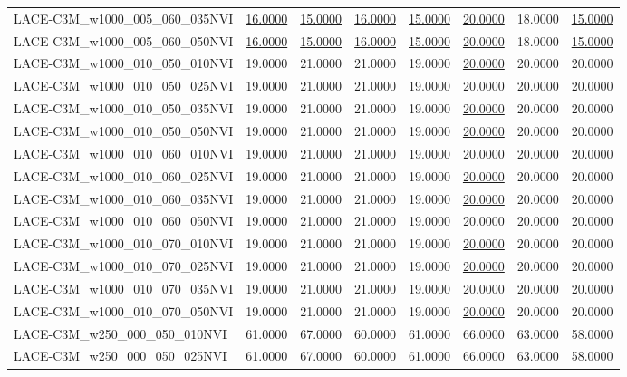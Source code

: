 \begin{table}
\begin{tabular}{lrrrrrrr}
LACE-C3M\_w1000\_005\_060\_035NVI & \underline{16.0000} & \underline{15.0000} & \underline{16.0000} & \underline{15.0000} & \underline{20.0000} & 18.0000 & \underline{15.0000} \\
LACE-C3M\_w1000\_005\_060\_050NVI & \underline{16.0000} & \underline{15.0000} & \underline{16.0000} & \underline{15.0000} & \underline{20.0000} & 18.0000 & \underline{15.0000} \\
LACE-C3M\_w1000\_010\_050\_010NVI & 19.0000 & 21.0000 & 21.0000 & 19.0000 & \underline{20.0000} & 20.0000 & 20.0000 \\
LACE-C3M\_w1000\_010\_050\_025NVI & 19.0000 & 21.0000 & 21.0000 & 19.0000 & \underline{20.0000} & 20.0000 & 20.0000 \\
LACE-C3M\_w1000\_010\_050\_035NVI & 19.0000 & 21.0000 & 21.0000 & 19.0000 & \underline{20.0000} & 20.0000 & 20.0000 \\
LACE-C3M\_w1000\_010\_050\_050NVI & 19.0000 & 21.0000 & 21.0000 & 19.0000 & \underline{20.0000} & 20.0000 & 20.0000 \\
LACE-C3M\_w1000\_010\_060\_010NVI & 19.0000 & 21.0000 & 21.0000 & 19.0000 & \underline{20.0000} & 20.0000 & 20.0000 \\
LACE-C3M\_w1000\_010\_060\_025NVI & 19.0000 & 21.0000 & 21.0000 & 19.0000 & \underline{20.0000} & 20.0000 & 20.0000 \\
LACE-C3M\_w1000\_010\_060\_035NVI & 19.0000 & 21.0000 & 21.0000 & 19.0000 & \underline{20.0000} & 20.0000 & 20.0000 \\
LACE-C3M\_w1000\_010\_060\_050NVI & 19.0000 & 21.0000 & 21.0000 & 19.0000 & \underline{20.0000} & 20.0000 & 20.0000 \\
LACE-C3M\_w1000\_010\_070\_010NVI & 19.0000 & 21.0000 & 21.0000 & 19.0000 & \underline{20.0000} & 20.0000 & 20.0000 \\
LACE-C3M\_w1000\_010\_070\_025NVI & 19.0000 & 21.0000 & 21.0000 & 19.0000 & \underline{20.0000} & 20.0000 & 20.0000 \\
LACE-C3M\_w1000\_010\_070\_035NVI & 19.0000 & 21.0000 & 21.0000 & 19.0000 & \underline{20.0000} & 20.0000 & 20.0000 \\
LACE-C3M\_w1000\_010\_070\_050NVI & 19.0000 & 21.0000 & 21.0000 & 19.0000 & \underline{20.0000} & 20.0000 & 20.0000 \\
LACE-C3M\_w250\_000\_050\_010NVI & 61.0000 & 67.0000 & 60.0000 & 61.0000 & 66.0000 & 63.0000 & 58.0000 \\
LACE-C3M\_w250\_000\_050\_025NVI & 61.0000 & 67.0000 & 60.0000 & 61.0000 & 66.0000 & 63.0000 & 58.0000 \\

\end{tabular}
\end{table}
